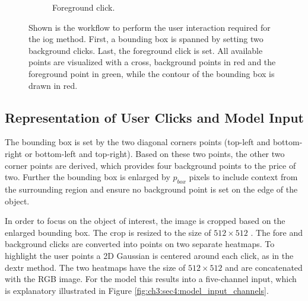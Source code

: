 \begin{figure}
\begin{subfigure}[b]{0.3\textwidth}
		\caption{Foreground click.}
		\label{fig:ch3:sec4:iog_workflow_3}
	\end{subfigure}
	\caption[IOG Application]{
		Shown is the workflow to perform the user interaction required for the \gls{iog} method.
		First, a bounding box is spanned by setting two background clicks.
		Last, the foreground click is set.
		All available points are visualized with a cross, background points in red and the foreground point in green, while the contour of the bounding box is drawn in red.
	} 
	\label{fig:ch3:sec4:iog_user_clicks}
\end{figure}

\subsection{Representation of User Clicks and Model Input}\label{ord:ch3:sec4:subsec2}

The bounding box is set by the two diagonal corners points (top-left and bottom-right or bottom-left and top-right).
Based on these two points, the other two corner points are derived, which provides four background points to the price of two.
Further the bounding box is enlarged by $p_{{box}}$ pixels to include context from the surrounding region and ensure no background point is set on the edge of the object.

In order to focus on the object of interest, the image is cropped based on the enlarged bounding box.
The crop is resized to the size of $512 \times 512$ . 
The fore and background clicks are converted into points on two separate heatmaps.
To highlight the user points a 2D Gaussian is centered around each click, as in the \gls{dextr} method.
The two heatmaps have the size of $512 \times 512$  and are concatenated with the RGB image.
For the model this results into a five-channel input, which is explanatory illustrated in Figure \ref{fig:ch3:sec4:model_input_channels}.

